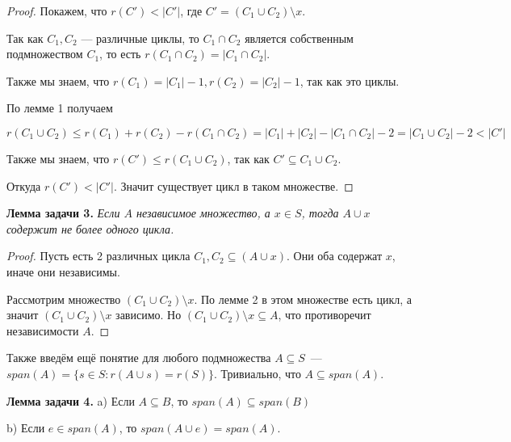 \begin{proof}
  Покажем, что $r(C') < |C'|$, где $C' = (C_1 \cup C_2) \setminus x$.

  Так как $C_1, C_2$ --- различные циклы, то $C_1 \cap C_2$ является собственным
  подмножеством $C_1$, то есть $r(C_1 \cap C_2) = |C_1 \cap C_2|$.

  Также мы знаем, что $r(C_1) = |C_1| - 1, r(C_2) = |C_2| - 1$, так как это циклы.

  По лемме 1 получаем

  \[
    r(C_1 \cup C_2) \leqslant r(C_1) + r(C_2) - r(C_1 \cap C_2) = |C_1| + |C_2|-
    |C_1 \cap C_2| - 2 = |C_1 \cup C_2| - 2 < |C'|
  \]

  Также мы знаем, что $r(C') \leqslant r(C_1 \cup C_2)$, так как $C' \subseteq
  C_1 \cup C_2$.

  Откуда $r(C') < |C'|$. Значит существует цикл в таком множестве.
\end{proof}

{\bf Лемма задачи 3.} {\it Если $A$ независимое множество, а $x \in S$, тогда $A \cup x$
содержит не более одного цикла.}

\begin{proof}
  Пусть есть 2 различных цикла $C_1, C_2 \subseteq (A \cup x)$. Они оба содержат
  $x$, иначе они независимы. 

  Рассмотрим множество $(C_1 \cup C_2) \setminus x$. По лемме 2 в этом множестве
  есть цикл, а значит $(C_1 \cup C_2) \setminus x$ зависимо. Но $(C_1 \cup C_2)
  \setminus x \subseteq A$, что противоречит независимости $A$.
\end{proof}

Также введём ещё понятие для любого подмножества $A \subseteq S$~---
$span(A) = \{s \in S : r(A \cup s) = r(S)\}$. Тривиально, что $A \subseteq span(A)$.

{\bf Лемма задачи 4.} a) Если $A \subseteq B$, то $span(A) \subseteq span(B)$

b) Если $e \in span(A)$, то $span(A \cup e) = span(A)$.

